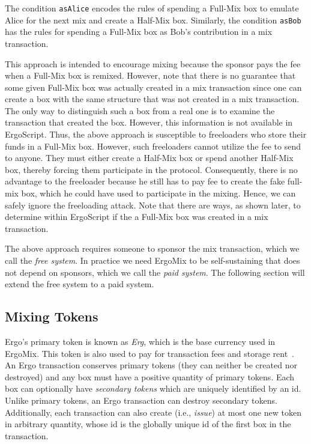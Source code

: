 \documentclass[11pt]{article}
\newcommand{\langname}{ErgoScript\xspace}
\newcommand{\mixname}{ErgoMix\xspace}
\begin{document}
The condition \texttt{asAlice} encodes the rules of spending a Full-Mix box to emulate Alice for the next mix and create a Half-Mix box. Similarly, the condition \texttt{asBob} has the rules for spending a Full-Mix box as Bob's contribution in a mix transaction. 

This approach is intended to encourage mixing because the sponsor pays the fee when a Full-Mix box is remixed. However, note that there is no guarantee that some given Full-Mix box was actually created in a mix transaction since one can create a box with the same structure that was not created in a mix transaction. The only way to distinguish such a box from a real one is to examine the transaction that created the box. However, this information is not available in \langname. Thus, the above approach is susceptible to freeloaders who store their funds in a Full-Mix box. However, such freeloaders cannot utilize the fee to send to anyone. They must either create a Half-Mix box or spend another Half-Mix box, thereby forcing them participate in the protocol. Consequently, there is no advantage to the freeloader because he still has to pay fee to create the fake full-mix box, which he could have used to participate in the mixing. Hence, we can safely ignore the freeloading attack. Note that there are ways, as shown later, to determine within \langname if the a Full-Mix box was created in a mix transaction.

The above approach requires someone to sponsor the mix transaction, which we call the {\em free system}. In practice we need \mixname to be self-sustaining that does not depend on sponsors, which we call the {\em paid system}. 
The following section will extend the free system to a paid system. 

\subsection{Mixing Tokens}

Ergo's primary token is known as {\em Erg}, which is the base currency used in \mixname. This token is also used to pay for transaction fees and storage rent~\cite{chepurnoy2018systematic}. An Ergo transaction conserves primary tokens (they can neither be created nor destroyed) and any box must have a positive quantity of primary tokens.
Each box can optionally have {\em secondary tokens} which are uniquely identified by an id. Unlike primary tokens, an Ergo transaction can destroy secondary tokens. Additionally, each transaction can also create (i.e., {\em issue}) at most one new token in arbitrary quantity, whose id is the globally unique id of the first box in the transaction. 
\end{document}
